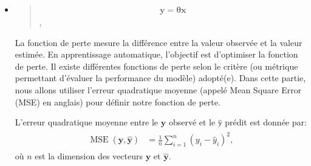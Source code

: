 \documentclass[letterpaper,11pt,english]{sphinxmanual}
\begin{document}
\begin{itemize}
\item {} 
\sphinxAtStartPar
{}


\begin{DUlineblock}{0em}
\item[] 
\end{DUlineblock}
\begin{quote}
\begin{equation}\label{equation:chapter3:chapter3:10}
\begin{split}\mathbf{y}=\boldsymbol{\theta} \mathbf{x}\end{split}
\end{equation}
\sphinxAtStartPar
,
\end{quote}


\sphinxAtStartPar
{}

\sphinxAtStartPar
La fonction de perte mesure la différence entre la valeur observée et
la valeur estimée. En apprentissage automatique, l’objectif est
d’optimiser la fonction de perte. Il existe différentes fonctions de
perte selon le critère (ou métrique permettant d’évaluer la
performance du modèle) adopté(e). Dans cette partie, nous allons
utiliser l’erreur quadratique moyenne (appelé Mean Square Error (MSE)
en anglais) pour définir notre fonction de perte.

\sphinxAtStartPar
L’erreur quadratique moyenne entre le \(\mathbf{y}\) observé et
le \(\mathbb{\hat{y}}\) prédit est donnée par:
\begin{equation}\label{equation:chapter3:chapter3:11}
\begin{split}\begin{aligned}
\operatorname{MSE}(\mathbf{y}, \hat{\boldsymbol{y}}) & = \frac{1}{n}\sum_{i=1}^{n}(y_i - \hat{y}_i)^2,\end{aligned}\end{split}
\end{equation}
\sphinxAtStartPar
où \(n\) est la dimension des vecteurs \(\mathbf{y}\) et
\(\hat{\boldsymbol{y}}\).


\end{itemize}
\end{document}
